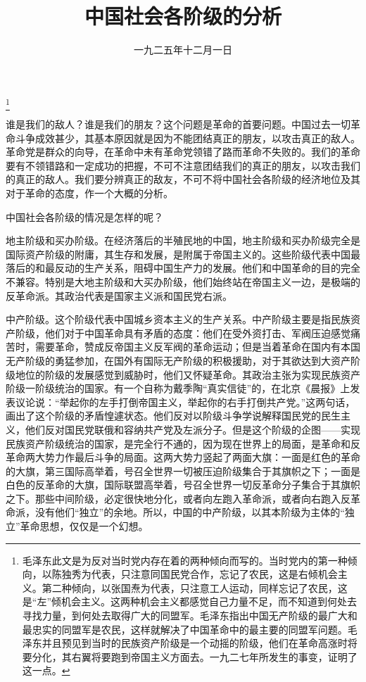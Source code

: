 
\title{中国社会各阶级的分析}
\date{一九二五年十二月一日}
\thanks{毛泽东此文是为反对当时党内存在着的两种倾向而写的。当时党内的第一种倾向，以陈独秀为代表，只注意同国民党合作，忘记了农民，这是右倾机会主义。第二种倾向，以张国焘为代表，只注意工人运动，同样忘记了农民，这是“左”倾机会主义。这两种机会主义都感觉自己力量不足，而不知道到何处去寻找力量，到何处去取得广大的同盟军。毛泽东指出中国无产阶级的最广大和最忠实的同盟军是农民，这样就解决了中国革命中的最主要的同盟军问题。毛泽东并且预见到当时的民族资产阶级是一个动摇的阶级，他们在革命高涨时将要分化，其右翼将要跑到帝国主义方面去。一九二七年所发生的事变，证明了这一点。}
\maketitle


谁是我们的敌人？谁是我们的朋友？这个问题是革命的首要问题。中国过去一切革命斗争成效甚少，其基本原因就是因为不能团结真正的朋友，以攻击真正的敌人。革命党是群众的向导，在革命中未有革命党领错了路而革命不失败的。我们的革命要有不领错路和一定成功的把握，不可不注意团结我们的真正的朋友，以攻击我们的真正的敌人。我们要分辨真正的敌友，不可不将中国社会各阶级的经济地位及其对于革命的态度，作一个大概的分析。

中国社会各阶级的情况是怎样的呢？

地主阶级和买办阶级。在经济落后的半殖民地的中国，地主阶级和买办阶级完全是国际资产阶级的附庸，其生存和发展，是附属于帝国主义的。这些阶级代表中国最落后的和最反动的生产关系，阻碍中国生产力的发展。他们和中国革命的目的完全不兼容。特别是大地主阶级和大买办阶级，他们始终站在帝国主义一边，是极端的反革命派。其政治代表是国家主义派和国民党右派。

中产阶级。这个阶级代表中国城乡资本主义的生产关系。中产阶级主要是指民族资产阶级，他们对于中国革命具有矛盾的态度：他们在受外资打击、军阀压迫感觉痛苦时，需要革命，赞成反帝国主义反军阀的革命运动；但是当着革命在国内有本国无产阶级的勇猛参加，在国外有国际无产阶级的积极援助，对于其欲达到大资产阶级地位的阶级的发展感觉到威胁时，他们又怀疑革命。其政治主张为实现民族资产阶级一阶级统治的国家。有一个自称为戴季陶“真实信徒”的，在北京《晨报》上发表议论说：“举起你的左手打倒帝国主义，举起你的右手打倒共产党。”这两句话，画出了这个阶级的矛盾惶遽状态。他们反对以阶级斗争学说解释国民党的民生主义，他们反对国民党联俄和容纳共产党及左派分子。但是这个阶级的企图——实现民族资产阶级统治的国家，是完全行不通的，因为现在世界上的局面，是革命和反革命两大势力作最后斗争的局面。这两大势力竖起了两面大旗：一面是红色的革命的大旗，第三国际高举着，号召全世界一切被压迫阶级集合于其旗帜之下；一面是白色的反革命的大旗，国际联盟高举着，号召全世界一切反革命分子集合于其旗帜之下。那些中间阶级，必定很快地分化，或者向左跑入革命派，或者向右跑入反革命派，没有他们“独立”的余地。所以，中国的中产阶级，以其本阶级为主体的“独立”革命思想，仅仅是一个幻想。

